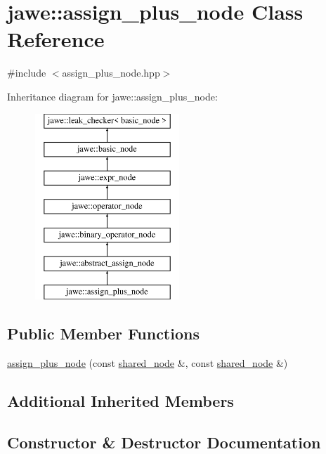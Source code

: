 \hypertarget{classjawe_1_1assign__plus__node}{}\section{jawe\+:\+:assign\+\_\+plus\+\_\+node Class Reference}
\label{classjawe_1_1assign__plus__node}


{\ttfamily \#include $<$assign\+\_\+plus\+\_\+node.\+hpp$>$}

Inheritance diagram for jawe\+:\+:assign\+\_\+plus\+\_\+node\+:\begin{figure}[H]
\begin{center}
\leavevmode
\includegraphics[height=7.000000cm]{classjawe_1_1assign__plus__node}
\end{center}
\end{figure}
\subsection*{Public Member Functions}
\begin{DoxyCompactItemize}
\item 
\hyperlink{classjawe_1_1assign__plus__node_a15d9635bfd0dd4cc3ca1a20829ff31f5}{assign\+\_\+plus\+\_\+node} (const \hyperlink{namespacejawe_a3f307481d921b6cbb50cc8511fc2b544}{shared\+\_\+node} \&, const \hyperlink{namespacejawe_a3f307481d921b6cbb50cc8511fc2b544}{shared\+\_\+node} \&)
\end{DoxyCompactItemize}
\subsection*{Additional Inherited Members}


\subsection{Constructor \& Destructor Documentation}
\mbox{\label{classjawe_1_1assign__plus__node_a15d9635bfd0dd4cc3ca1a20829ff31f5}} 
